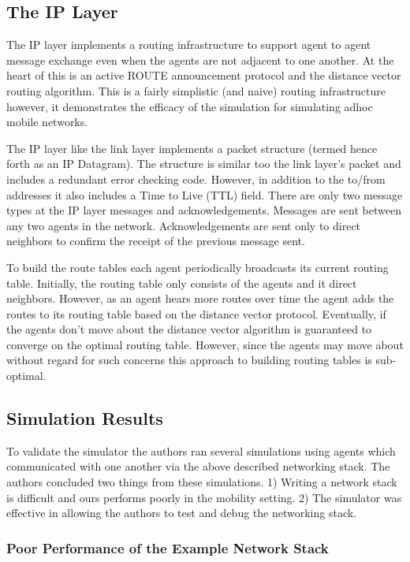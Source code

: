 \subsection{The IP Layer}

The IP layer implements a routing infrastructure to support agent to agent message exchange even
when the agents are not adjacent to one another. At the heart of this is an active ROUTE
announcement protocol and the distance vector routing algorithm. This is a fairly simplistic (and
naive) routing infrastructure however, it demonstrates the efficacy of the simulation for simulating
adhoc mobile networks.

The IP layer like the link layer implements a packet structure (termed hence forth as an IP
Datagram). The structure is similar too the link layer's packet and includes a redundant error
checking code. However, in addition to the to/from addresses it also includes a Time to Live (TTL)
field. There are only two message types at the IP layer messages and acknowledgements. Messages are
sent between any two agents in the network. Acknowledgements are sent only to direct neighbors to
confirm the receipt of the previous message sent. 

To build the route tables each agent periodically broadcasts its current routing table. Initially,
the routing table only consists of the agents and it direct neighbors. However, as an agent hears
more routes over time the agent adds the routes to its routing table based on the distance vector
protocol. Eventually, if the agents don't move about the distance vector algorithm is guaranteed to
converge on the optimal routing table. However, since the agents may move about without regard for
such concerns this approach to building routing tables is sub-optimal.

\subsection{Simulation Results}

To validate the simulator the authors ran several simulations using agents which communicated with
one another via the above described networking stack. The authors concluded two things from these
simulations. 1) Writing a network stack is difficult and ours performs poorly in the mobility
setting. 2) The simulator was effective in allowing the authors to test and debug the networking
stack.

\subsubsection{Poor Performance of the Example Network Stack}

